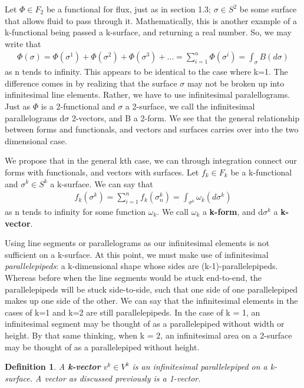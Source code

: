 \documentclass{book}
\newtheorem{defn}[equation]{Definition}
\begin{document}
Let $\Phi \in F_2$ be a functional for flux, just as in section 1.3; $\sigma \in S^2$ be some surface that allows fluid to pass through it. Mathematically, this is another example of a k-functional being passed a k-surface, and returning a real number. So, we may write that \begin{gather}\Phi(\sigma) = \Phi(\sigma^1) + \Phi(\sigma^2) + \Phi(\sigma^3) + ... = \sum_{i=1}^n \Phi(\sigma^i) = \int_\sigma B(d\sigma)\end{gather} as n tends to infinity. This appears to be identical to the case where k=1. The difference comes in by realizing that the surface $\sigma$ may not be broken up into infinitesimal line elements. Rather, we have to use infinitesimal paralellograms. Just as $\Phi$ is a 2-functional and $\sigma$ a 2-surface, we call the infinitesimal parallelograms d$\sigma$ 2-vectors, and B a 2-form. We see that the general relationship between forms and functionals, and vectors and surfaces carries over into the two dimensional case.  


We propose that in the general kth case, we can through integration connect our forms with functionals, and vectors with surfaces. Let $f_k \in F_k$ be a k-functional and $\sigma^k \in S^k$ a k-surface. We can say that \begin{gather}f_k(\sigma^k) = \sum_{i=1}^n f_k(\sigma^k_n) = \int_{\sigma^k} \omega_k(d\sigma^k)\end{gather} as n tends to infinity for some function $\omega_k$. We call $\omega_k$ a \textbf{k-form}, and d$\sigma^k$ a \textbf{k-vector}. 

Using line segments or parallelograms as our infinitesimal elements is not sufficient on a k-surface. At this point, we must make use of infinitesimal \emph{parallelepipeds}: a k-dimensional shape whose sides are (k-1)-parallelepipeds. Whereas before when the line segments would be stuck end-to-end, the parallelepipeds will be stuck side-to-side, such that one side of one parallelepiped makes up one side of the other. We can say that the infinitesimal elements in the cases of k=1 and k=2 are still parallelepipeds. In the case of k = 1, an infinitesimal segment may be thought of as a parallelepiped without width or height. By that same thinking, when k = 2, an infinitesimal area on a 2-surface may be thought of as a parallelepiped without height. 



\begin{defn}
	A \textbf{k-vector} $v^k \in V^k$ is an infinitesimal parallelepiped on a k-surface. A vector as discussed previously is a 1-vector. 
\end{defn}
\end{document}
